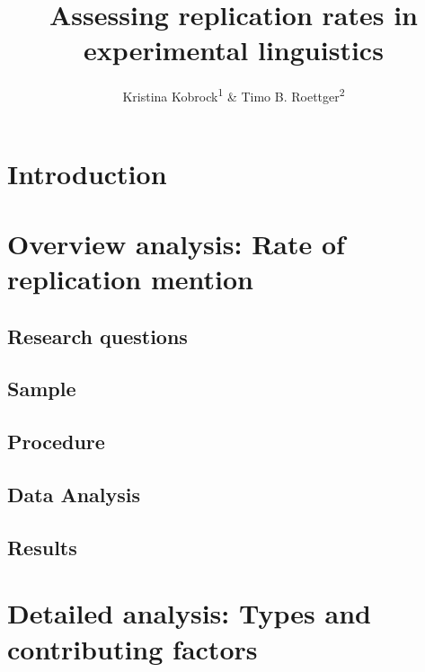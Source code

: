 \documentclass[
  english,
  man]{apa6}
\title{Assessing replication rates in experimental linguistics}
\author{Kristina Kobrock\textsuperscript{1} \& Timo B. Roettger\textsuperscript{2}}
\date{}
\affiliation{\vspace{0.5cm}\textsuperscript{1} University of Osnabrück\\\textsuperscript{2} University of Oslo}
\begin{document}
\maketitle

\hypertarget{introduction}{%
\section{Introduction}\label{introduction}}

\hypertarget{overview-analysis-rate-of-replication-mention}{%
\section{Overview analysis: Rate of replication mention}\label{overview-analysis-rate-of-replication-mention}}

\hypertarget{research-questions}{%
\subsection{Research questions}\label{research-questions}}

\hypertarget{sample}{%
\subsection{Sample}\label{sample}}

\hypertarget{procedure}{%
\subsection{Procedure}\label{procedure}}

\hypertarget{data-analysis}{%
\subsection{Data Analysis}\label{data-analysis}}

\hypertarget{results}{%
\subsection{Results}\label{results}}

\hypertarget{detailed-analysis-types-and-contributing-factors}{%
\section{Detailed analysis: Types and contributing factors}\label{detailed-analysis-types-and-contributing-factors}}
\end{document}
